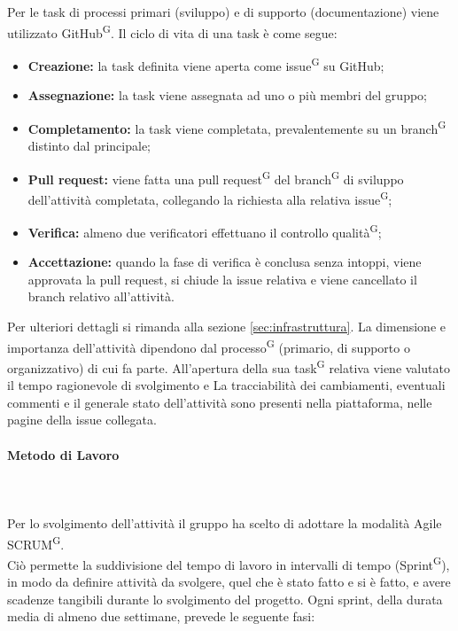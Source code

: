 \documentclass[8pt]{article}
\newcommand{\glossterm}[1]{#1\textsuperscript{G}} %
\newcommand{\subsubsubsection}[1]{\paragraph{#1}\mbox{}\\}
\begin{document}
Per le task di processi primari (sviluppo) e di supporto (documentazione) viene utilizzato \glossterm{GitHub}.
Il ciclo di vita di una task è come segue:
\begin{itemize}
    \item \textbf{Creazione:} la task definita viene aperta come \glossterm{issue} su GitHub;
    \item \textbf{Assegnazione:} la task viene assegnata ad uno o più membri del gruppo;
    \item \textbf{Completamento:} la task viene completata, prevalentemente su un \glossterm{branch} distinto
      dal principale;
  \item \textbf{Pull request:} viene fatta una \glossterm{pull request} del \glossterm{branch} di sviluppo
      dell'attività completata, collegando la richiesta alla relativa \glossterm{issue};
  \item \textbf{Verifica:} almeno due verificatori effettuano il controllo \glossterm{qualità};
  \item \textbf{Accettazione:} quando la fase di verifica è conclusa senza intoppi, viene approvata la pull request, si chiude la issue relativa e viene cancellato il branch relativo all'attività.
\end{itemize}
Per ulteriori dettagli si rimanda alla sezione \hypersetup{hidelinks}\ref{sec:infrastruttura}. La dimensione e importanza
dell'attività dipendono dal \glossterm{processo} (primario, di supporto o organizzativo) di cui fa parte.
All'apertura della sua \glossterm{task} relativa viene valutato il tempo ragionevole di svolgimento e 
La tracciabilità dei cambiamenti, eventuali commenti e il generale stato dell'attività sono presenti nella piattaforma, nelle pagine della issue collegata.
\subsubsubsection{Metodo di Lavoro} \label{sec:metodo_lavoro}\\
Per lo svolgimento dell'attività il gruppo ha scelto di adottare la modalità Agile \glossterm{SCRUM}.\\
Ciò permette la suddivisione del tempo di lavoro in intervalli di tempo (\glossterm{Sprint}), in modo da definire attività da svolgere, quel che è stato fatto e si è fatto, e avere scadenze tangibili durante lo svolgimento del progetto.
Ogni sprint, della durata media di almeno due settimane, prevede le seguente fasi:
\end{document}
